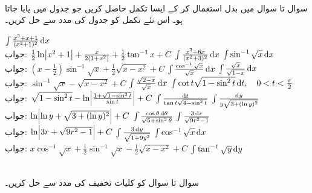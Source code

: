\\
سوال  تا سوال  میں بدل استعمال کر کے ایسا تکمل حاصل کریں جو جدول میں پایا جاتا ہو۔ اس نئے تکمل کو جدول کی مدد سے حل کریں۔ 

$\int\frac{x^3+x+1}{(x^2+1)^2}\dif x$\\
جواب:\quad
$\tfrac{1}{2}\ln\abs{x^2+1}+\tfrac{x}{2(1+x^2)}+\tfrac{1}{2}\tan^{-1}x+C$
$\int\frac{x^2+6x}{(x^2+3)^2}\dif x$
$\int\sin^{-1}\sqrt{x}\dif x$\\
جواب:\quad
$(x-\tfrac{1}{2})\sin^{-1}\sqrt{x}+\tfrac{1}{2}\sqrt{x-x^2}+C$
$\int\frac{\cos^{-1}\sqrt{x}}{\sqrt{x}}\dif x$
$\int\frac{\sqrt{x}}{\sqrt{1-x}}\dif x$\\
جواب:\quad
$\sin^{-1}\sqrt{x}-\sqrt{x-x^2}+C$
$\int\frac{\sqrt{2-x}}{\sqrt{x}}\dif x$
$\int \cot t\sqrt{1-\sin^2t}\dif t,\quad 0<t<\frac{\pi}{2}$\\
جواب:\quad
$\sqrt{1-\sin^2t}-\ln\abs{\tfrac{1+\sqrt{1-\sin^2t}}{\sin t}}+C$
$\int\frac{\dif t}{\tan t\sqrt{4-\sin^2t}}$
$\int\frac{\dif y}{y\sqrt{3+(\ln y)^2}}$\\
جواب:\quad
$\ln\abs{\ln y+\sqrt{3+(\ln y)^2}}+C$
$\int\frac{\cos\theta\dif\theta}{\sqrt{5+\sin^2\theta}}$
$\int\frac{3\dif r}{\sqrt{9r^2-1}}$\\
جواب:\quad
$\ln\abs{3r+\sqrt{9r^2-1}}+C$
$\int\frac{3\dif y}{\sqrt{1+9y^2}}$
$\int\cos^{-1}\sqrt{x}\dif x$\\
جواب:\quad
$x\cos^{-1}\sqrt{x}+\tfrac{1}{2}\sin^{-1}\sqrt{x}-\tfrac{1}{2}\sqrt{x-x^2}+C$
$\int\tan^{-1}\sqrt{y}\dif y$

\\
سوال  تا سوال  کو کلیات تخفیف کی مدد سے حل کریں۔

